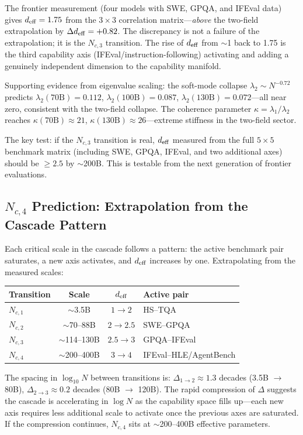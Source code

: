 \documentclass[11pt]{article}
\begin{document}
The frontier measurement (four models with SWE, GPQA, and IFEval data) gives $d_{\rm eff} = 1.75$ from the $3 \times 3$ correlation matrix---\emph{above} the two-field extrapolation by $\Delta d_{\rm eff} = +0.82$.
The discrepancy is not a failure of the extrapolation; it is the $N_{c,3}$ transition.
The rise of $d_{\rm eff}$ from $\sim$1 back to 1.75 is the third capability axis (IFEval/instruction-following) activating and adding a genuinely independent dimension to the capability manifold.

Supporting evidence from eigenvalue scaling:
the soft-mode collapse $\lambda_2 \sim N^{-0.72}$ predicts $\lambda_2(70\text{B}) = 0.112$, $\lambda_2(100\text{B}) = 0.087$, $\lambda_2(130\text{B}) = 0.072$---all near zero, consistent with the two-field collapse.
The coherence parameter $\kappa = \lambda_1/\lambda_2$ reaches $\kappa(70\text{B}) \approx 21$, $\kappa(130\text{B}) \approx 26$---extreme stiffness in the two-field sector.

The key test: if the $N_{c,3}$ transition is real, $d_{\rm eff}$ measured from the full $5 \times 5$ benchmark matrix (including SWE, GPQA, IFEval, and two additional axes) should be $\geq 2.5$ by $\sim$200B.
This is testable from the next generation of frontier evaluations.

\subsection{$N_{c,4}$ Prediction: Extrapolation from the Cascade Pattern}

Each critical scale in the cascade follows a pattern: the active benchmark pair saturates, a new axis activates, and $d_{\rm eff}$ increases by one.
Extrapolating from the measured scales:
\begin{center}
\begin{tabular}{lccl}
\hline
Transition & Scale & $d_{\rm eff}$ & Active pair \\
\hline
$N_{c,1}$ & $\sim$3.5B   & $1 \to 2$ & HS--TQA \\
$N_{c,2}$ & $\sim$70--88B  & $2 \to 2.5$ & SWE--GPQA \\
$N_{c,3}$ & $\sim$114--130B & $2.5 \to 3$ & GPQA--IFEval \\
$N_{c,4}$ & $\sim$200--400B & $3 \to 4$ & IFEval--HLE/AgentBench \\
\hline
\end{tabular}
\end{center}

The spacing in $\log_{10}N$ between transitions is: $\Delta_{1\to2} \approx 1.3$ decades (3.5B $\to$ 80B), $\Delta_{2\to3} \approx 0.2$ decades (80B $\to$ 120B).
The rapid compression of $\Delta$ suggests the cascade is accelerating in $\log N$ as the capability space fills up---each new axis requires less additional scale to activate once the previous axes are saturated.
If the compression continues, $N_{c,4}$ sits at $\sim$200--400B effective parameters.
\end{document}
